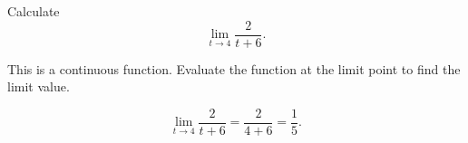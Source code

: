 \documentclass{ximera}
\author{Emma Smith Zbarsky}
\begin{document}
\begin{exercise}

Calculate \[\lim_{t\to 4} \frac{2}{t+6}.\]


\begin{hint}
This is a continuous function. Evaluate the function at the limit point
to find the limit value.
\end{hint}


\begin{hint}
\[\lim_{t\to 4} \frac{2}{t+6} = \frac{2}{4+6} = \frac{1}{5}.\]
\end{hint}


\begin{multipleChoice}
\choice{$\infty$}
\end{multipleChoice}

\end{exercise}
\end{document}
